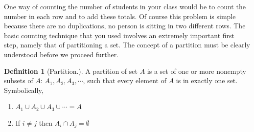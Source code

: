 \documentclass[10pt,]{book}
\theoremstyle{plain}
\theoremstyle{definition}
\newtheorem{definition}[theorem]{Definition}
\theoremstyle{definition}
\theoremstyle{definition}
\begin{document}
 One way of counting the number of students in your class would be to count the number in each row and to add these totals. Of course this problem is simple because there are no duplications, no person is sitting in two different rows. The basic counting technique that you used involves an extremely important first step, namely that of partitioning a set. The concept of a partition must be clearly understood before we proceed further.
%
\begin{definition}[Partition.]\label{partition}
 A partition of set \(A\) is a set of one or more nonempty subsets of \(A\): \(A_1, A_2, A_3, \cdots\), such that every element of \(A\) is in exactly one set.  Symbolically, %
\par
\leavevmode%
\begin{enumerate}[label=\alph*]
\item\hypertarget{li-39}{}\(A_1 \cup A_2 \cup A_3 \cup \cdots = A\)%
\item\hypertarget{li-40}{}If  \(i \neq j\) then \(A_i \cap A_j = \emptyset\)%
\end{enumerate}
%
\end{definition}
\par
\end{document}
